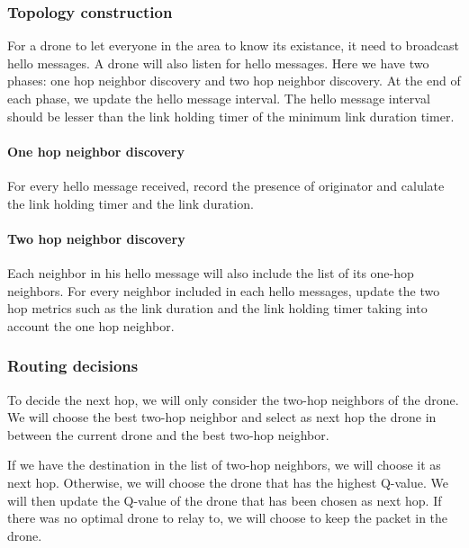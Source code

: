 \subsubsection{Topology construction}

For a drone to let everyone in the area to know its existance, it need to broadcast hello messages.
A drone will also listen for hello messages.
Here we have two phases: one hop neighbor discovery and two hop neighbor discovery.
At the end of each phase, we update the hello message interval.
The hello message interval should be lesser than the link holding timer of the minimum link
duration timer.

\paragraph{One hop neighbor discovery}
For every hello message received, record the presence of originator and
calulate the link holding timer and the link duration.

\paragraph{Two hop neighbor discovery}
Each neighbor in his hello message will also include the list of its one-hop neighbors.
For every neighbor included in each hello messages, update the two hop metrics such as the
link duration and the link holding timer taking into account the one hop neighbor.


\subsubsection{Routing decisions}
To decide the next hop, we will only consider the two-hop neighbors of the drone. %
We will choose the best two-hop neighbor and select as next hop the drone in between
the current drone and the best two-hop neighbor.

If we have the destination in the list of two-hop neighbors, we will choose it as next hop.
Otherwise, we will choose the drone that has the highest Q-value.
We will then update the Q-value of the drone that has been chosen as next hop.
If there was no optimal drone to relay to, we will choose to keep the packet in the drone.